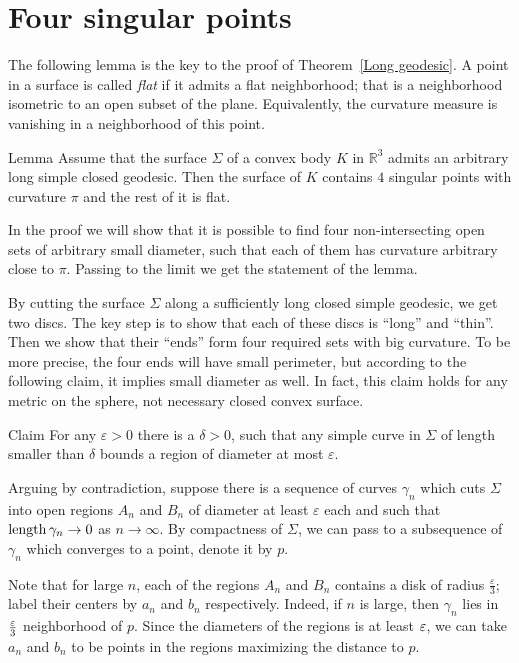 \documentclass[oneside,a4paper, 12pt]{article}
\begin{document}
\section{Four singular points}

The following lemma is the key to the proof of Theorem~\ref{Long geodesic}.
A point in a surface is called \emph{flat} if it admits a flat neighborhood;
that is a neighborhood isometric to an open subset of the plane.
Equivalently, the curvature measure is vanishing in a neighborhood of this point.

\begin{thm}{Lemma} 
	\label{lem:4 singular points}
Assume that the surface $\Sigma$ of a convex body $K$ in $\mathbb{R}^3$
admits an arbitrary long simple closed geodesic.
Then the surface of $K$ contains $4$ singular points with curvature $\pi$ and the rest of it is flat.
\end{thm}

In the proof we will show that 
it is possible to find four non-intersecting open sets of arbitrary small diameter, 
such that each of them has curvature arbitrary close to $\pi$.
Passing to the limit we get the statement of the lemma.

By cutting the surface $\Sigma$ along a sufficiently long closed simple geodesic,
we get two discs.
The key step is to show that each of these discs is ``long'' and ``thin''.
Then we show that their ``ends'' form four required sets with big curvature.
To be more precise, the four ends will have small perimeter,
but according to the following claim, it implies small diameter as well.
In fact, this claim holds for any metric on the sphere, not necessary closed convex surface.

\begin{thm}{Claim}\label{Lemma:diameter-perimeter}
For any $\varepsilon>0$ there is a $\delta>0$, such that any simple curve in $\Sigma$ of length smaller than $\delta$ bounds a region of diameter at most $\varepsilon$.
\end{thm}

Arguing by contradiction, suppose there is a sequence of curves $\gamma_n$ which cuts $\Sigma$ into open regions $A_n$ and $B_n$ of diameter at least $\varepsilon$ each and such that $\mathop{\rm length}\nolimits\gamma_n\to 0$ as $n\to\infty$. 
By compactness of $\Sigma$,
we can pass to a subsequence of $\gamma_n$ which converges to a point, denote it by $p$. 

Note that for large $n$, each of the regions $A_n$ and $B_n$ contains a disk of radius $\tfrac\varepsilon3$;
label their centers by $a_n$ and $b_n$ respectively. 
Indeed, if $n$ is large, then $\gamma_n$ lies in $\tfrac{\varepsilon}3$ neighborhood of $p$.
Since the diameters of the regions is at least $\varepsilon$, we can take $a_n$ and $b_n$ to be points in the regions maximizing the distance to $p$.
\end{document}
